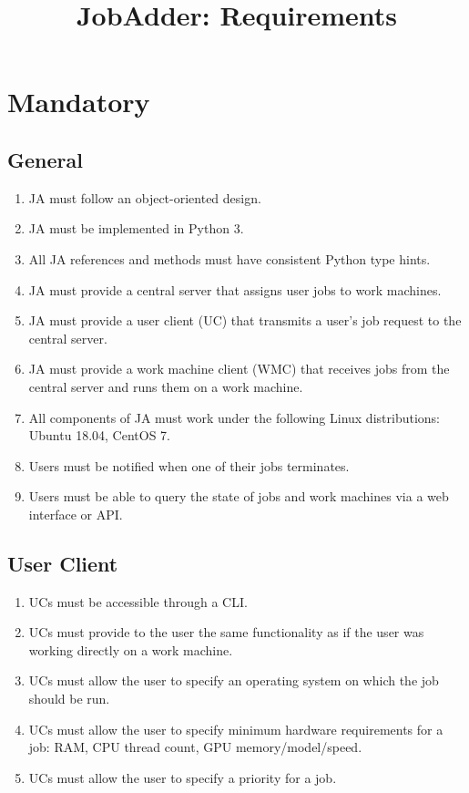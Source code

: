 \documentclass[a4paper,10pt]{article}
\title{JobAdder: Requirements}
\author{}
\begin{document}
\maketitle

\section{Mandatory}
\subsection{General}
\begin{enumerate}
 \item JA must follow an object-oriented design.
 \item JA must be implemented in Python 3.
 \item All JA references and methods must have consistent Python type hints.
 \item JA must provide a central server that assigns user jobs to work machines.
 \item JA must provide a user client (UC) that transmits a user's job request to the central server.
 \item JA must provide a work machine client (WMC) that receives jobs from the central server and runs them on a work machine.
 \item All components of JA must work under the following Linux distributions: Ubuntu 18.04, CentOS 7.
 \item Users must be notified when one of their jobs terminates.
 \item Users must be able to query the state of jobs and work machines via a web interface or API.
\end{enumerate}
\subsection{User Client}
\begin{enumerate}
 \item UCs must be accessible through a CLI.
 \item UCs must provide to the user the same functionality as if the user was working directly on a work machine.
 \item UCs must allow the user to specify an operating system on which the job should be run.
 \item UCs must allow the user to specify minimum hardware requirements for a job: RAM, CPU thread count, GPU memory/model/speed.
 \item UCs must allow the user to specify a priority for a job.
\end{enumerate}
\end{document}
